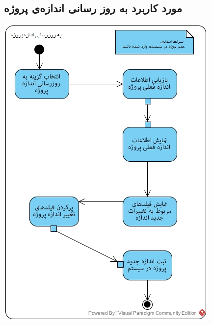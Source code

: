 \documentclass{article}
\begin{document}
\subsection*{مورد کاربرد به روز رسانی اندازه‌ی پروژه}
\vspace{2cm}
\begin{center}
\includegraphics[width=\textwidth]{ActivityDiagrams/26.jpg}
\end{center}

\newpage
\vspace{2cm}
\end{document}
